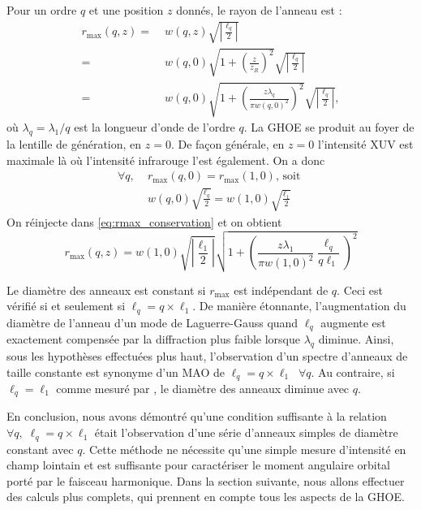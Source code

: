 Pour un ordre $q$ et une position $z$ donnés, le rayon de l'anneau est :
\begin{align}
{r_{{\mathrm{max}}}}\left( {q,z} \right) =& \;w\left( {q,z} \right)\sqrt {\left| {\frac{{{\ell _q}}}{2}} \right|} \nonumber\\ 
=& \;w\left( {q,0} \right)\sqrt {1 + {{\left( {\frac{z}{z_R}} \right)}^2}} \sqrt {\left| {\frac{{{\ell _q}}}{2}} \right|} \nonumber\\
=& \;w\left( {q,0} \right)\sqrt {1 + {{\left( {\frac{{z\lambda _q}}{{{\pi w{{\left( {{q},0} \right)}^2}}}}} \right)}^2}} \sqrt {\left| {\frac{{{\ell _q}}}{2}} \right|},
\label{eq:rmax_conservation}
\end{align}
où ${\lambda _q} = {\lambda _1}/q$ est la longueur d'onde de l'ordre $q$. La GHOE se produit au foyer de la lentille de génération, en $z=0$. De façon générale, en $z=0$ l'intensité XUV est maximale là où l'intensité infrarouge l'est également. On a donc
\begin{align*}
\forall q,\;&{r_{{\mathrm{max}}}}\left( {q,0} \right)={r_{{\mathrm{max}}}}\left( {1,0} \right) \text{, soit }\\
&w\left( {{q},0} \right)\sqrt {\frac{{{\ell _q}}}{2}}  = w\left( {{1},0} \right)\sqrt {\frac{{{\ell _1}}}{2}}
\end{align*}
On réinjecte dans \ref{eq:rmax_conservation} et on obtient
\begin{equation*}
{r_{{\mathrm{max}}}}\left( {q,z} \right) = w\left( {{1},0} \right)\sqrt {\left| {\frac{{{\ell _1}}}{2}} \right|}\sqrt {1 + {{\left( {\frac{{{z\lambda_1}}}{\pi w{{\left( {{1},0} \right)}^2}}\frac{\ell _q}{q{\ell _1}}}\right)}^2}} 
\end{equation*}

Le diamètre des anneaux est constant si ${r_{{\mathrm{max}}}}$ est indépendant de $q$. Ceci est vérifié si et seulement si $\ell _q=q\times\ell_1$. De manière étonnante, l'augmentation du diamètre de l'anneau d'un mode de Laguerre-Gauss quand $\ell_q$ augmente est exactement compensée par la diffraction plus faible lorsque $\lambda_q$ diminue. Ainsi, sous les hypothèses effectuées plus haut, l'observation d'un spectre d'anneaux de taille constante est synonyme d'un MAO de $\ell_q=q\times\ell_1\;\;\forall q$. Au contraire, si $\ell_q = \ell_1$ comme mesuré par , le diamètre des anneaux diminue avec $q$. 

En conclusion, nous avons démontré qu'une condition suffisante à la relation $\forall q,\; \ell_q = q\times\ell_1$ était l'observation d'une série d'anneaux simples de diamètre constant avec $q$. Cette méthode ne nécessite qu'une simple mesure d'intensité en champ lointain et est suffisante pour caractériser le moment angulaire orbital porté par le faisceau harmonique. Dans la section suivante, nous allons effectuer des calculs plus complets, qui prennent en compte tous les aspects de la GHOE.

